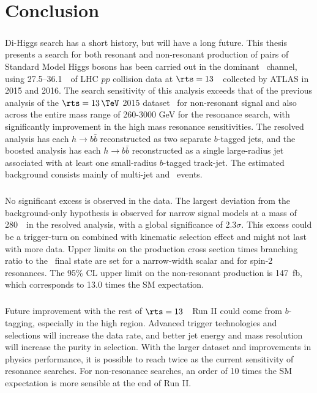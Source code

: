 \chapter{Conclusion}
\label{conclusion}

\paragraph{}
Di-Higgs search has a short history, but will have a long future. This thesis presents a search for both resonant and non-resonant production of pairs of Standard Model Higgs bosons has been carried out in the dominant \fourb\ channel, using 27.5--36.1~\ifb\ of LHC $pp$ collision data at $\rts = 13$~\TeV\ collected by ATLAS in 2015 and 2016. The search sensitivity of this analysis exceeds that of the previous analysis of the $\rts = 13\,\TeV$ 2015 dataset~\cite{Aaboud:2016xco} for non-resonant signal and also across the entire mass range of 260-3000 GeV for the resonance search, with significantly improvement in the high mass resonance sensitivities. The resolved analysis has each $h \to b\bar{b}$ reconstructed as two separate $b$-tagged jets, and the boosted analysis has each $h \to b\bar{b}$ reconstructed as a single large-radius jet associated with at least one small-radius $b$-tagged track-jet. The estimated background consists mainly of multi-jet and \ttbar\ events.

\paragraph{}
No significant excess is observed in the data. The largest deviation from the background-only hypothesis is observed for narrow signal models at a mass of 280~\GeV\ in the resolved analysis, with a global significance of 2.3$\sigma$. This excess could be a trigger-turn on combined with kinematic selection effect and might not last with more data. Upper limits on the production cross section times branching ratio to the \fourb\ final state are set for a narrow-width scalar and for spin-2 resonances. The 95\% CL upper limit on the non-resonant production is 147~fb, which corresponds to 13.0 times the SM expectation. %

\paragraph{}
Future improvement with the rest of $\rts = 13$~\TeV\ Run II could come from $b$-tagging, especially in the high \pt region. Advanced trigger technologies and selections will increase the data rate, and better jet energy and mass resolution will increase the purity in selection. With the larger dataset and improvements in physics performance, it is possible to reach twice as the current sensitivity of resonance searches. For non-resonance searches, an order of 10 times the SM expectation is more sensible at the end of Run II.


